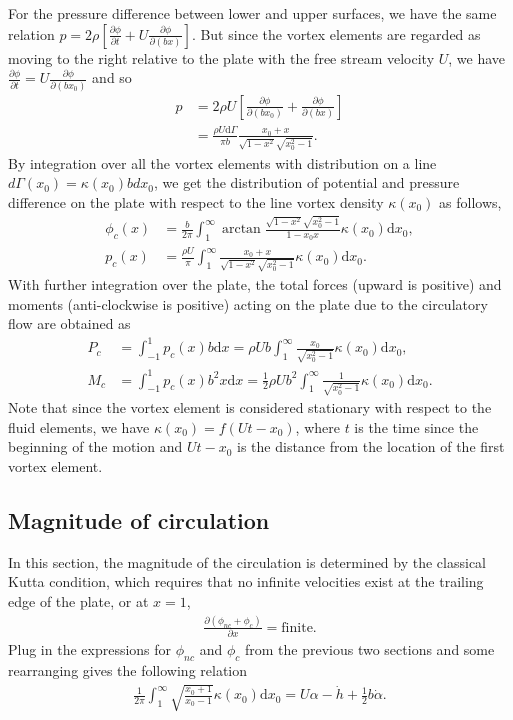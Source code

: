 For the pressure difference between lower and upper surfaces, we have the same relation $p = 2 \rho[\frac{\partial \phi}{\partial t} + U\frac{\partial \phi}{\partial (bx)}]$.
But since the vortex elements are regarded as moving to the right relative to the plate with the free stream velocity $U$,  we have $\frac{\partial \phi}{\partial t} = U\frac{\partial \phi}{\partial (bx_0)}$ and so 
\begin{align}
p & = 2\rho U [\frac{\partial \phi}{\partial (bx_0)} + \frac{\partial \phi}{\partial (bx)}]  \\
   & =  \frac{\rho U \mathrm{d}\Gamma}{\pi b} \frac{x_0+x}{\sqrt{1-x^2}\sqrt{x_0^2-1}}.
\end{align}
By integration over all the vortex elements with distribution on a line $d\Gamma(x_0) = \kappa(x_0)bdx_0$, we get the distribution of potential and pressure difference on the plate with respect to the line vortex density $\kappa(x_0)$ as follows,
\begin{align}
\phi_c(x) & =  \frac{b}{2\pi} \int_{1}^{\infty}\arctan \frac{\sqrt{1-x^2}\sqrt{x_0^2-1}}{1-x_0x} \kappa(x_0) \mathrm{d}x_0, \\
p_c(x) &  =  \frac{\rho U}{\pi} \int_{1}^{\infty}\frac{x_0+x}{\sqrt{1-x^2}\sqrt{x_0^2-1}} \kappa(x_0) \mathrm{d}x_0.
\end{align}
With further integration over the plate, the total forces (upward is positive) and moments (anti-clockwise is positive) acting on the plate due to the circulatory flow are obtained as
\begin{align}
P_c & =  \int_{-1}^{1} p_c (x) b \mathrm{d}x
   =  \rho U b \int_{1}^{\infty} \frac{x_0}{\sqrt{x_0^2-1}} \kappa(x_0) \mathrm{d}x_0, \\
M_c & =  \int_{-1}^{1} p_c (x) b^2 x \mathrm{d}x
   =   \frac{1}{2} \rho U b^2 \int_{1}^{\infty} \frac{1}{\sqrt{x_0^2-1}} \kappa(x_0) \mathrm{d}x_0.
\end{align}
Note that since the vortex element is considered stationary with respect to the fluid elements, we have $\kappa (x_0) = f(Ut - x_0)$, where $t$ is the time since the beginning of the motion and $Ut-x_0$ is the distance from the location of the first vortex element.


\subsection{Magnitude of circulation}

In this section, the magnitude of the circulation is determined by the classical Kutta condition, which requires that no infinite velocities exist at the trailing edge of the plate, or at $x = 1$,
\begin{align}
\frac{\partial (\phi_{nc} + \phi_c)}{\partial x} = \text{finite}.
\end{align}
Plug in the expressions for $\phi_{nc}$ and $\phi_c$ from the previous two sections and some rearranging gives the following relation
\begin{align}       \label{eqn:Kutta}
\frac{1}{2\pi} \int_{1}^{\infty} \sqrt{\frac{x_0+1}{x_0-1}} \kappa(x_0) \mathrm{d}x_0 = U \alpha - \dot{h} + \frac{1}{2}b\dot{\alpha}.
\end{align}

